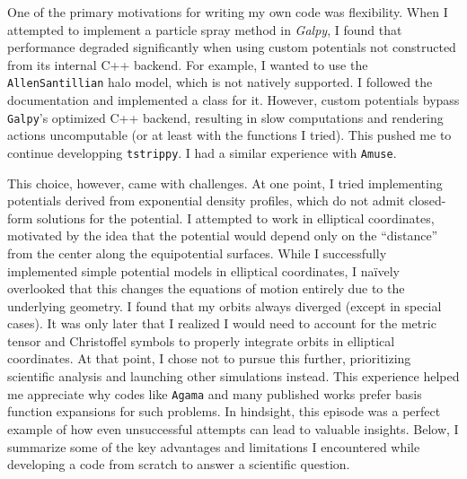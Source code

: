         One of the primary motivations for writing my own code was flexibility. When I attempted to implement a particle spray method in \textit{Galpy}, I found that performance degraded significantly when using custom potentials not constructed from its internal C++ backend. For example, I wanted to use the \texttt{AllenSantillian} halo model, which is not natively supported. I followed the documentation and implemented a class for it. However, custom potentials bypass \texttt{Galpy}'s optimized C++ backend, resulting in slow computations and rendering actions uncomputable (or at least with the functions I tried). This pushed me to continue developping \texttt{tstrippy}. I had a similar experience with \texttt{Amuse}.

        This choice, however, came with challenges. At one point, I tried implementing potentials derived from exponential density profiles, which do not admit closed-form solutions for the potential. I attempted to work in elliptical coordinates, motivated by the idea that the potential would depend only on the ``distance'' from the center along the equipotential surfaces. While I successfully implemented simple potential models in elliptical coordinates, I naïvely overlooked that this changes the equations of motion entirely due to the underlying geometry. I found that my orbits always diverged (except in special cases). It was only later that I realized I would need to account for the metric tensor and Christoffel symbols to properly integrate orbits in elliptical coordinates. At that point, I chose not to pursue this further, prioritizing scientific analysis and launching other simulations instead. This experience helped me appreciate why codes like \texttt{Agama} and many published works prefer basis function expansions for such problems. In hindsight, this episode was a perfect example of how even unsuccessful attempts can lead to valuable insights. Below, I summarize some of the key advantages and limitations I encountered while developing a code from scratch to answer a scientific question.

